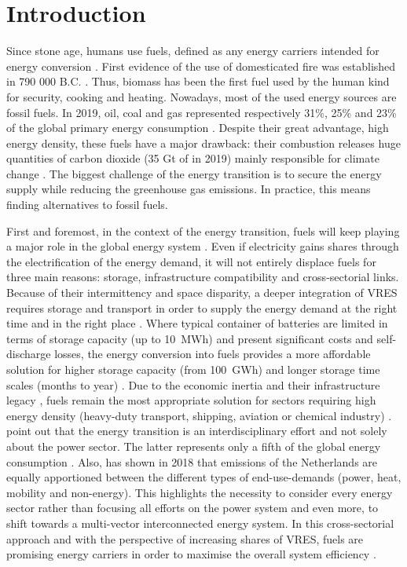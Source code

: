 \section{Introduction}
\label{sec:intro}
Since stone age, humans use fuels, defined as any energy carriers intended for energy conversion \cite{FAO_biofuel, ISO16559}. First evidence of the use of domesticated fire was established in 790 000 B.C. \cite{alperson2010acheulian}. Thus, biomass has been the first fuel used by the human kind for security, cooking and heating. Nowadays, most of the used energy sources are fossil fuels. In 2019, oil, coal and gas represented respectively 31\%, 25\% and 23\% of the global primary energy consumption \cite{ourworld_2019}. Despite their great advantage, high energy density, these fuels have a major drawback: their combustion releases huge quantities of carbon dioxide (35 Gt of  in 2019) mainly responsible for climate change \cite{iea2020world}. The biggest challenge of the energy transition is to secure the energy supply while reducing the greenhouse gas emissions. In practice, this means finding alternatives to fossil fuels.

First and foremost, in the context of the energy transition, fuels will keep playing a major role in the global energy system \cite{Ahlgren2012}. Even if electricity gains shares through the electrification of the energy demand, it will not entirely displace fuels for three main reasons: storage, infrastructure compatibility and cross-sectorial links. Because of their intermittency and space disparity, a deeper integration of \gls{VRES} requires storage and transport in order to supply the energy demand at the right time and in the right place \cite{Brouwer2016,Evans2012,Gallo2016,hall2008,Rosa2017}. Where typical container of batteries are limited in terms of storage capacity (up to 10~MWh) and present significant costs and self-discharge losses, the energy conversion into fuels provides a more affordable solution for higher storage capacity (from 100~GWh) and longer storage time scales (months to year) \cite{Rosa2017}. Due to the economic inertia and their infrastructure legacy \cite{Ahlgren2012}, fuels remain the most appropriate solution for sectors requiring high energy density (\eg heavy-duty transport, shipping, aviation or chemical industry) \cite{Albrecht2020,Decker2019,Goede2018,Pearson2012,Rosa2017,Stancin2020,Trieb2018,Zeman2008}. 
\citet{contino2020whole} point out that the energy transition is an interdisciplinary effort and not solely about the power sector. The latter represents only a fifth of the global energy consumption \cite{iea_renewable}. Also, \citet{Goede2018} has shown in 2018 that  emissions of the Netherlands are equally apportioned between the different types of end-use-demands (\ie power, heat, mobility and non-energy). This highlights the necessity to consider every energy sector rather than focusing all efforts on the power system and even more, to shift towards a multi-vector interconnected energy system. In this cross-sectorial approach and with the perspective of increasing shares of \gls{VRES}, fuels are promising energy carriers in order to maximise the overall system efficiency \cite{mathiesen2015, Stancin2020}.

